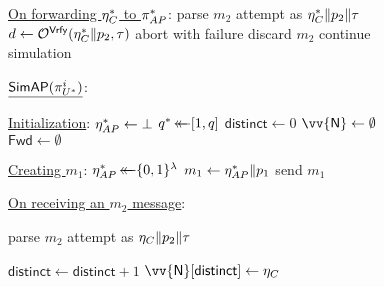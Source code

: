 \begin{figure}
\begin{adjustbox}{margin*=2ex,width=0.997\textwidth,frame,center}
\begin{minipage}[t]{0.53\textwidth}
\begin{algorithmic}[1]
				\Statex \underline{On forwarding $\eta_{C}^*$ to $\oracle[AP][*]$}:  \label{code:simC:line:forward_C_nonce_start}
				\setcounter{ALG@line}{400} 
				\Indent
					\State parse $m_2$ attempt as $\eta_C^* \| p_2 \| \tau$
					\State $d \gets \mathcal{O}^{\mathsf{Vrfy}}(\eta_{C}^* \| p_2, \tau)$ \label{code:simC:line:nonce_forwarding:embed_MAC_oracle}
						\State abort with failure \label{code:simC:line:nonce_forwarding:stop_simulation}
					\Else
						\State discard $m_2$
						\State continue simulation \label{code:simC:line:forward_C_nonce_end}
					\EndIf
				\EndIndent	
	
			\end{algorithmic}
	\end{minipage}
	\begin{minipage}[t]{0.5\textwidth}
			$\underline{\simAP(\eatarget)}$: 
			\begin{algorithmic}[1]
				\Statex
			
				\Statex \underline{Initialization}: \label{code:simAP:line:init_start}
				\setcounter{ALG@line}{100}
				\Indent
					\State $\eta_{AP}^* \gets \bot$
					\State $q^* \operatorname{\leftarrow\mathrel{\mkern-14mu}\leftarrow} [1, q]$ \label{code:simAP:line:init_end}
					\State $\mathsf{distinct} \gets 0$
					\State $\vv{\mathsf{N}} \gets \emptyset$
					\State $\mathsf{Fwd} \gets \emptyset$
				\EndIndent
					
				\Statex
				
				\Statex \underline{Creating $m_1$}: \label{code:simAP:line:m_1_start}
				\setcounter{ALG@line}{200}
				\Indent
					\State $\eta_{AP}^* \operatorname{\leftarrow\mathrel{\mkern-14mu}\leftarrow} \lbrace 0, 1 \rbrace^\lambda$
					\State $m_1 \gets \eta_{AP}^* \| p_1$
					\State send $m_1$ \label{code:simAP:line:m_1_end}
				\EndIndent
				

				
				
				\Statex
				
				\Statex \underline{On receiving an $m_2$ message}: \label{code:simAP:line:m_2_start}
				\setcounter{ALG@line}{300}
				
				\Indent
					\State parse $m_2$ attempt as $\eta_C \| p_2 \| \tau$
					
					\State
						\State $\mathsf{distinct} \gets \mathsf{distinct} + 1$
						\State $\vv{\mathsf{N}}[\mathsf{distinct}] \gets  \nonce_{C}$
							

\end{algorithmic}
\end{minipage}
\end{adjustbox}
\end{figure}

